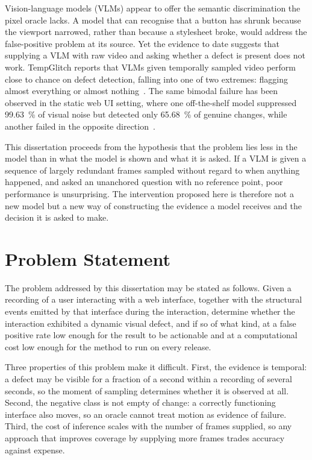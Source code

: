 Vision-language models (VLMs) appear to offer the semantic discrimination
the pixel oracle lacks. A model that can recognise that a button has
shrunk because the viewport narrowed, rather than because a stylesheet
broke, would address the false-positive problem at its source. Yet the
evidence to date suggests that supplying a VLM with raw video and asking
whether a defect is present does not work. TempGlitch reports that VLMs
given temporally sampled video perform close to chance on defect
detection, falling into one of two extremes: flagging almost everything or
almost nothing~\citep{tempglitch}. The same bimodal failure has been
observed in the static web UI setting, where one off-the-shelf model
suppressed \SI{99.63}{\percent} of visual noise but detected only
\SI{65.68}{\percent} of genuine changes, while another failed in the
opposite direction~\citep{zhang2026beyond}.

This dissertation proceeds from the hypothesis that the problem lies less
in the model than in what the model is shown and what it is asked. If a
VLM is given a sequence of largely redundant frames sampled without regard
to when anything happened, and asked an unanchored question with no
reference point, poor performance is unsurprising. The intervention
proposed here is therefore not a new model but a new way of constructing
the evidence a model receives and the decision it is asked to make.


\section{Problem Statement}
\label{sec:problem}

The problem addressed by this dissertation may be stated as follows.
Given a recording of a user interacting with a web interface, together
with the structural events emitted by that interface during the
interaction, determine whether the interaction exhibited a dynamic visual
defect, and if so of what kind, at a false positive rate low enough for
the result to be actionable and at a computational cost low enough for the
method to run on every release.

Three properties of this problem make it difficult. First, the evidence is
temporal: a defect may be visible for a fraction of a second within a
recording of several seconds, so the moment of sampling determines whether
it is observed at all. Second, the negative class is not empty of change:
a correctly functioning interface also moves, so an oracle cannot treat
motion as evidence of failure. Third, the cost of inference scales with
the number of frames supplied, so any approach that improves coverage by
supplying more frames trades accuracy against expense.



